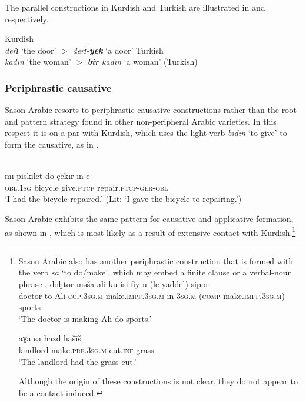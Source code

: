 \documentclass[output=paper]{langsci/langscibook}
\begin{document}
\noindent The parallel constructions in Kurdish and Turkish are illustrated in  and  respectively.

\begin{exe}
\ex \label{defkr} Kurdish\\	\textit{derɪ}̂ `the door' 	$>$ \textit{derɪ́-\textbf{yek}} `a door'
\ex \label{deftk} Turkish\\	\textit{kadın} `the woman' $>$ \textit{\textbf{bir} kadın} `a woman' (Turkish)
\end{exe}

 
\subsubsection{Periphrastic causative}

Sason Arabic resorts to periphrastic causative constructions rather than the root and pattern strategy found in other non-peripheral Arabic varieties. In this respect it is on a par with Kurdish, which uses the light verb \textit{bıdın} ‘to give’ to form the causative, as in . 

\begin{exe}
\ex \label{perrk}
\\
\gll  	mı         piskilet      	   do      	çekır-ın-e	\\
        \textsc{obl.1sg} bicycle  give.\textsc{ptcp}   repair.\textsc{ptcp-ger-obl}	 \\
        \glt `I had the bicycle repaired.' (Lit: `I gave the bicycle to repairing.')
\end{exe}
										
Sason Arabic exhibits the same pattern for causative and applicative formation, as shown in , which is most likely as a result of extensive contact with Kurdish.\footnote{Sason Arabic also has another periphrastic construction that is formed with the verb \textit{sa} `to do/make', which may embed a finite clause  or a verbal-noun phrase . 
\ea \label{make} 
\ea 
\label{makefin}  \gll doḫtor mə\v{s}a ali ku isi fiy-u (le yaddel) sipor \\
		doctor to Ali \textsc{cop.3sg.m} make.\textsc{impf.3sg.m} in-\textsc{3sg.m} (\textsc{comp} make.\textsc{impf.3sg.m}) sports\\\glt `The doctor is making Ali do sports.' 
	
		\ex \label{makeinf} \gll aɣa sa hazd ha\v{s}ī\v{s}\\
		landlord make.\textsc{prf.3sg.m} cut.\textsc{inf} grass  \\
		\glt 	`The landlord had the grass cut.'
\z
\z

\noindent Although the origin of these constructions is not clear, they do not appear to be a contact-induced.
}
\end{document}
